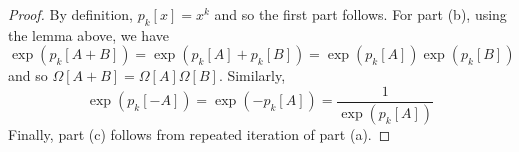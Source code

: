 \documentclass[11pt,leqno,oneside]{amsart}
\numberwithin{thm}{section}
\begin{document}
\begin{proof}
  By definition, \(p_k[x] = x^k\) and so the first part follows. For
  part (b), using the lemma above, we have \[
    \exp\left( p_k[A+B] \right) = \exp\left(
      p_k[A]+p_k[B] \right) = \exp\left(p_k[A]
    \right)\exp \left(p_k[B] \right) 
  \]
  and so \(\Omega[A+B] = \Omega[A]\Omega[B]\). Similarly, \[
    \exp\left( p_k[-A] \right) = \exp\left( -p_k[A] \right) =
    \frac{1}{\exp\left( p_k[A] \right)} 
  \]
  Finally, part (c) follows from repeated iteration of part (a).
\end{proof}
  
\end{document}
